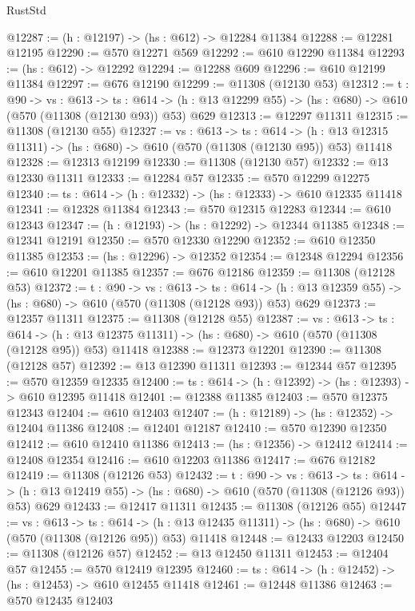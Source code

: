 \begin{lexlean}{RustStd}
\begin{coremodule}
@12287 := (h : @12197) -> (hs : @612) -> @12284 @11384
@12288 := @12281 @12195
@12290 := @570 @12271 @569
@12292 := @610 @12290 @11384
@12293 := (hs : @612) -> @12292
@12294 := @12288 @609
@12296 := @610 @12199 @11384
@12297 := @676 @12190
@12299 := @11308 (@12130 @53)
@12312 := {t : @90} ->
  {vs : @613} ->
  {ts : @614} -> (h : @13 @12299 @55) -> (hs : @680) -> @610 (@570 (@11308 (@12130 @93)) @53) @629
@12313 := @12297 @11311
@12315 := @11308 (@12130 @55)
@12327 := {vs : @613} ->
  {ts : @614} ->
  (h : @13 @12315 @11311) -> (hs : @680) -> @610 (@570 (@11308 (@12130 @95)) @53) @11418
@12328 := @12313 @12199
@12330 := @11308 (@12130 @57)
@12332 := @13 @12330 @11311
@12333 := @12284 @57
@12335 := @570 @12299 @12275
@12340 := {ts : @614} -> (h : @12332) -> (hs : @12333) -> @610 @12335 @11418
@12341 := @12328 @11384
@12343 := @570 @12315 @12283
@12344 := @610 @12343
@12347 := (h : @12193) -> (hs : @12292) -> @12344 @11385
@12348 := @12341 @12191
@12350 := @570 @12330 @12290
@12352 := @610 @12350 @11385
@12353 := (hs : @12296) -> @12352
@12354 := @12348 @12294
@12356 := @610 @12201 @11385
@12357 := @676 @12186
@12359 := @11308 (@12128 @53)
@12372 := {t : @90} ->
  {vs : @613} ->
  {ts : @614} -> (h : @13 @12359 @55) -> (hs : @680) -> @610 (@570 (@11308 (@12128 @93)) @53) @629
@12373 := @12357 @11311
@12375 := @11308 (@12128 @55)
@12387 := {vs : @613} ->
  {ts : @614} ->
  (h : @13 @12375 @11311) -> (hs : @680) -> @610 (@570 (@11308 (@12128 @95)) @53) @11418
@12388 := @12373 @12201
@12390 := @11308 (@12128 @57)
@12392 := @13 @12390 @11311
@12393 := @12344 @57
@12395 := @570 @12359 @12335
@12400 := {ts : @614} -> (h : @12392) -> (hs : @12393) -> @610 @12395 @11418
@12401 := @12388 @11385
@12403 := @570 @12375 @12343
@12404 := @610 @12403
@12407 := (h : @12189) -> (hs : @12352) -> @12404 @11386
@12408 := @12401 @12187
@12410 := @570 @12390 @12350
@12412 := @610 @12410 @11386
@12413 := (hs : @12356) -> @12412
@12414 := @12408 @12354
@12416 := @610 @12203 @11386
@12417 := @676 @12182
@12419 := @11308 (@12126 @53)
@12432 := {t : @90} ->
  {vs : @613} ->
  {ts : @614} -> (h : @13 @12419 @55) -> (hs : @680) -> @610 (@570 (@11308 (@12126 @93)) @53) @629
@12433 := @12417 @11311
@12435 := @11308 (@12126 @55)
@12447 := {vs : @613} ->
  {ts : @614} ->
  (h : @13 @12435 @11311) -> (hs : @680) -> @610 (@570 (@11308 (@12126 @95)) @53) @11418
@12448 := @12433 @12203
@12450 := @11308 (@12126 @57)
@12452 := @13 @12450 @11311
@12453 := @12404 @57
@12455 := @570 @12419 @12395
@12460 := {ts : @614} -> (h : @12452) -> (hs : @12453) -> @610 @12455 @11418
@12461 := @12448 @11386
@12463 := @570 @12435 @12403

\end{coremodule}
\end{lexlean}
